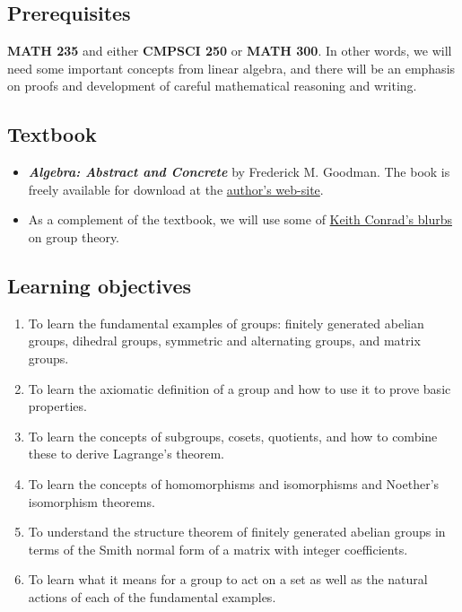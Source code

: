 \documentclass[11pt]{article}
\begin{document}
\subsection{Prerequisites}
\label{sec:orgf456c22}
\textbf{MATH 235} and either \textbf{CMPSCI 250} or \textbf{MATH 300}. In other words, we will need some
important concepts from linear algebra, and there will be an emphasis on proofs
and development of careful mathematical reasoning and writing.

\subsection{Textbook}
\label{sec:org1549feb}
\begin{itemize}
\item \textbf{\emph{Algebra: Abstract and Concrete}} by Frederick M. Goodman. The book is
freely available for download at the \href{https://homepage.divms.uiowa.edu/\~goodman/algebrabook.dir/algebrabook.html}{author's web-site}.
\item As a complement of the textbook, we will use some of \href{https://kconrad.math.uconn.edu/blurbs/}{Keith Conrad's blurbs} on
group theory.
\end{itemize}

\subsection{Learning objectives}
\label{sec:org0aeb825}

\begin{enumerate}
\item To learn the fundamental examples of groups: finitely generated abelian
groups, dihedral groups, symmetric and alternating groups, and matrix
groups.
\item To learn the axiomatic definition of a group and how to use it to prove
basic properties.
\item To learn the concepts of subgroups, cosets, quotients, and how to combine
these to derive Lagrange’s theorem.
\item To learn the concepts of homomorphisms and isomorphisms and Noether's
isomorphism theorems.
\item To understand the structure theorem of finitely generated abelian groups in
terms of the Smith normal form of a matrix with integer coefficients.
\item To learn what it means for a group to act on a set as well as the
natural actions of each of the fundamental examples.
\end{enumerate}
\end{document}

